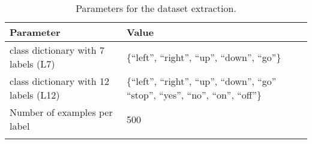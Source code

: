 \begin{table}[ht!]
\begin{center}
\caption{Parameters for the dataset extraction.}
\begin{tabular}{ M{7cm}  M{6cm}}
\toprule
\textbf{Parameter} & \textbf{Value} \\
\midrule
class dictionary with 7 labels (L7) & \{\enquote{left},  \enquote{right}, \enquote{up}, \enquote{down}, \enquote{go}\}\\
class dictionary with 12 labels (L12) & \{\enquote{left},  \enquote{right}, \enquote{up}, \enquote{down}, \enquote{go}\, \enquote{stop}, \enquote{yes}, \enquote{no}, \enquote{on}, \enquote{off}\}\\
\midrule
Number of examples per label & 500 \\ 
\bottomrule
\label{tab:exp_details_params_dataset}
\end{tabular}
\end{center}
\end{table}
\FloatBarrier
\noindent